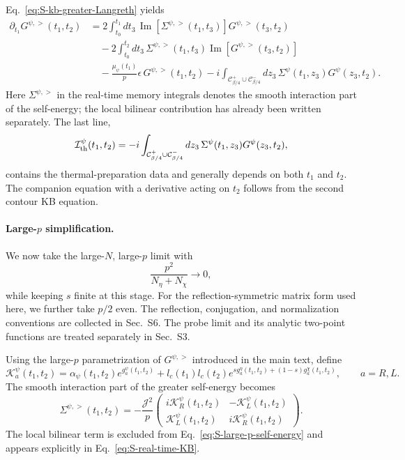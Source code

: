\documentclass[11pt,a4paper]{article}
\begin{document}
Eq.~\eqref{eq:S-kb-greater-Langreth} yields
\begin{equation}
\begin{aligned}
\partial_{t_1}G^{\psi,>}(t_1,t_2)
&=
2\int_{t_0}^{t_1}dt_3\,
\operatorname{Im}[\Sigma^{\psi,>}(t_1,t_3)]
G^{\psi,>}(t_3,t_2)
\\
&\quad
-2\int_{t_0}^{t_2}dt_3\,
\Sigma^{\psi,>}(t_1,t_3)
\operatorname{Im}[G^{\psi,>}(t_3,t_2)]
\\
&\quad
-\frac{\mu_\psi(t_1)}{p}
\epsilon\,G^{\psi,>}(t_1,t_2)
-i
\int_{\mathcal C^+_{\beta/4}\cup\mathcal C^-_{\beta/4}}
dz_3\,
\Sigma^\psi(t_1,z_3)G^\psi(z_3,t_2).
\end{aligned}
\label{eq:S-real-time-KB}
\end{equation}
Here \(\Sigma^{\psi,>}\) in the real-time memory integrals denotes the smooth
interaction part of the self-energy; the local bilinear contribution has
already been written separately. The last line,
\begin{equation}
\mathcal I^\psi_{\rm th}(t_1,t_2)
=
-i
\int_{\mathcal C^+_{\beta/4}\cup\mathcal C^-_{\beta/4}}
dz_3\,
\Sigma^\psi(t_1,z_3)G^\psi(z_3,t_2),
\label{eq:S-thermal-memory}
\end{equation}
contains the thermal-preparation data and generally depends on both
\(t_1\) and \(t_2\). The companion equation with a derivative acting on
\(t_2\) follows from the second contour KB equation.

\paragraph*{Large-\(p\) simplification.}

We now take the large-\(N\), large-\(p\) limit with
\begin{equation}
\frac{p^2}{N_\eta+N_\chi}
\longrightarrow0,
\label{eq:S-large-p-control}
\end{equation}
while keeping \(s\) finite at this stage. For the reflection-symmetric matrix
form used here, we further take \(p/2\) even. The reflection, conjugation, and
normalization conventions are collected in Sec.~S6. The probe limit and its analytic two-point functions are treated separately
in Sec.~S3.

Using the large-\(p\) parametrization of \(G^{\psi,>}\) introduced in the main
text, define
\begin{equation}
\mathcal K^\psi_a(t_1,t_2)
=
\alpha_\psi(t_1,t_2)e^{g^\psi_a(t_1,t_2)}
+
l_c(t_1)l_c(t_2)
e^{
s g^\eta_a(t_1,t_2)
+
(1-s)g^\chi_a(t_1,t_2)
},
\qquad
a=R,L .
\label{eq:S-large-p-kernel}
\end{equation}
The smooth interaction part of the greater self-energy becomes
\begin{equation}
\Sigma^{\psi,>}(t_1,t_2)
=
-\frac{\mathcal J^2}{p}
\begin{pmatrix}
i\mathcal K^\psi_R(t_1,t_2)
&
-\mathcal K^\psi_L(t_1,t_2)
\\
\mathcal K^\psi_L(t_1,t_2)
&
i\mathcal K^\psi_R(t_1,t_2)
\end{pmatrix}.
\label{eq:S-large-p-self-energy}
\end{equation}
The local bilinear term is excluded from
Eq.~\eqref{eq:S-large-p-self-energy} and appears explicitly in
Eq.~\eqref{eq:S-real-time-KB}.
\end{document}
